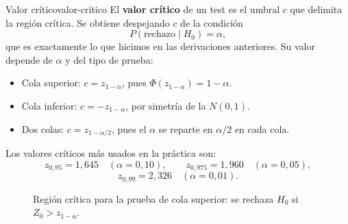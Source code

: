 \documentclass[12pt, a4paper]{book}
\numberwithin{equation}{chapter}
\begin{document}
\begin{definicion}{Valor cr\'{i}tico}{valor-critico}
	El \textbf{valor cr\'{i}tico} de un test es el
	umbral $c$ que delimita la regi\'{o}n cr\'{i}tica.
	Se obtiene despejando $c$ de la condici\'{o}n
	\[
	P(\text{rechazo} \mid H_0) = \alpha,
	\]
	que es exactamente lo que hicimos en las
	derivaciones anteriores. Su valor depende de
	$\alpha$ y del tipo de prueba:
	\begin{itemize}[leftmargin=2em]
		\item Cola superior: $c = z_{1-\alpha}$,
		pues $\Phi(z_{1-\alpha}) = 1-\alpha$.
		\item Cola inferior: $c = -z_{1-\alpha}$,
		por simetr\'{i}a de la $N(0,1)$.
		\item Dos colas: $c = z_{1-\alpha/2}$,
		pues el $\alpha$ se reparte en $\alpha/2$
		en cada cola.
	\end{itemize}
	Los valores cr\'{i}ticos m\'{a}s usados en la
	pr\'{a}ctica son:
	\[
	z_{0{,}95} = 1{,}645 \quad (\alpha = 0{,}10),
	\qquad
	z_{0{,}975} = 1{,}960 \quad (\alpha = 0{,}05),
	\]
	\[
	z_{0{,}99} = 2{,}326 \quad (\alpha = 0{,}01).
	\]
\end{definicion}

\begin{figure}[H]
	\centering
	\caption{Regi\'{o}n cr\'{i}tica para la prueba de
		cola superior: se rechaza $H_0$ si
		$Z_0 > z_{1-\alpha}$.}
	\label{fig:cola-superior}
\end{figure}
\end{document}
